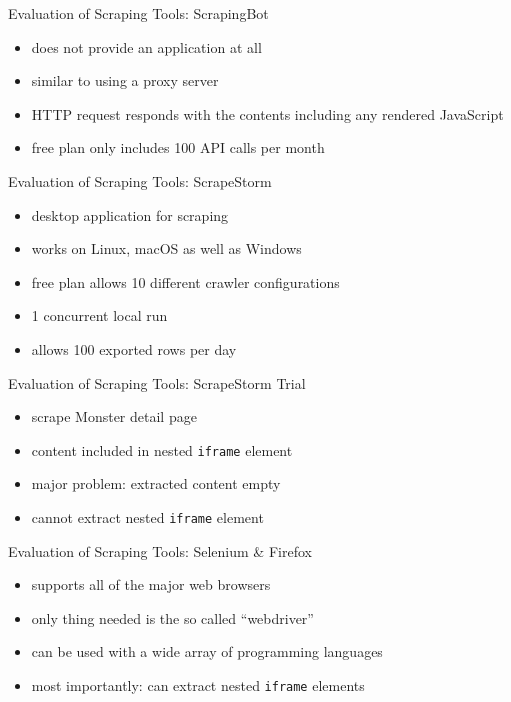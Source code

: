 \documentclass[aspectratio=169]{beamer}
\begin{document}
  \begin{frame}{Evaluation of Scraping Tools: ScrapingBot}
    \begin{itemize}
      \item does not provide an application at all
      \item similar to using a proxy server
      \item HTTP request responds with the contents including any rendered JavaScript
      \item free plan only includes 100 API calls per month
    \end{itemize}
  \end{frame}

  \begin{frame}{Evaluation of Scraping Tools: ScrapeStorm}
    \begin{itemize}
      \item desktop application for scraping
      \item works on Linux, macOS as well as Windows
      \item free plan allows 10 different crawler configurations
      \item 1 concurrent local run
      \item allows 100 exported rows per day
    \end{itemize}
  \end{frame}

  \begin{frame}{Evaluation of Scraping Tools: ScrapeStorm Trial}
    \begin{itemize}
      \item scrape Monster detail page
      \item content included in nested \texttt{iframe} element
      \item major problem: extracted content empty
      \item cannot extract nested \texttt{iframe} element
    \end{itemize}
  \end{frame}

  \begin{frame}{Evaluation of Scraping Tools: Selenium \& Firefox}
    \begin{itemize}
      \item supports all of the major web browsers
      \item only thing needed is the so called “webdriver”
      \item can be used with a wide array of programming languages
      \item most importantly: can extract nested \texttt{iframe} elements
    \end{itemize}
  \end{frame}
\end{document}
